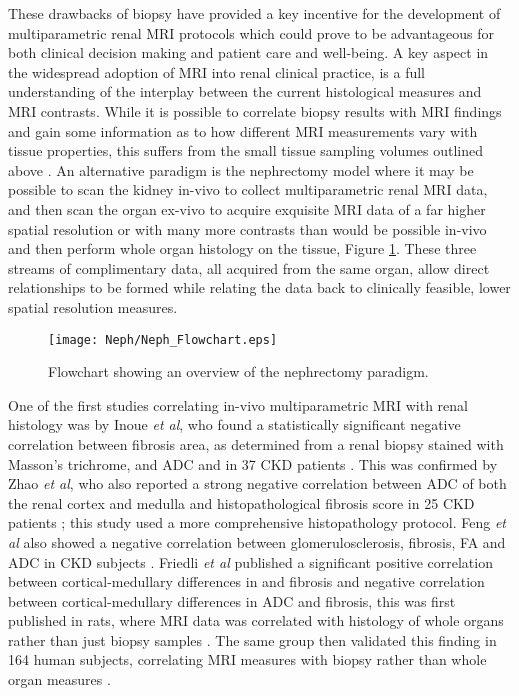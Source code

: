These drawbacks of biopsy have provided a key incentive for the development of multiparametric renal \ac{MRI} protocols which could prove to be advantageous for both clinical decision making and patient care and well-being. A key aspect in the widespread adoption of \ac{MRI} into renal clinical practice, is a full understanding of the interplay between the current histological measures and \ac{MRI} contrasts. While it is possible to correlate biopsy results with \ac{MRI} findings and gain some information as to how different \ac{MRI} measurements vary with tissue properties, this suffers from the small tissue sampling volumes outlined above \cite{leung_could_2017}. An alternative paradigm is the nephrectomy model where it may be possible to scan the kidney in-vivo to collect multiparametric renal \ac{MRI} data, and then scan the organ ex-vivo to acquire exquisite \ac{MRI} data of a far higher spatial resolution or with many more contrasts than would be possible in-vivo and then perform whole organ histology on the tissue, Figure \ref{fig:ex_neph_flowchart}. These three streams of complimentary data, all acquired from the same organ, allow direct relationships to be formed while relating the data back to clinically feasible, lower spatial resolution measures.

\begin{figure}[H]
	\centering
	\texttt{[image: Neph/Neph\_Flowchart.eps]}
	\caption{Flowchart showing an overview of the nephrectomy paradigm.}
	\label{fig:ex_neph_flowchart}	
\end{figure}


One of the first studies correlating in-vivo multiparametric \ac{MRI} with renal histology was by Inoue \textit{et al}, who found a statistically significant negative correlation between fibrosis area, as determined from a renal biopsy stained with Masson's trichrome, and \ac{ADC} and \ttwostar in 37 \ac{CKD} patients \cite{inoue_noninvasive_2011}. This was confirmed by Zhao \textit{et al}, who also reported a strong negative correlation between \ac{ADC} of both the renal cortex and medulla and histopathological fibrosis score in 25 \ac{CKD} patients \cite{zhao_assessment_2014}; this study used a more comprehensive histopathology protocol. Feng \textit{et al} also showed a negative correlation between glomerulosclerosis, fibrosis, \ac{FA} and \ac{ADC} in \ac{CKD} subjects \cite{feng_dti_2015}. Friedli \textit{et al} published a significant positive correlation between cortical-medullary differences in \tone and fibrosis and negative correlation between cortical-medullary differences in  \ac{ADC} and fibrosis, this was first published in rats, where \ac{MRI} data was correlated with histology of whole organs rather than just biopsy samples \cite{friedli_new_2016}. The same group then validated this finding in 164 human subjects, correlating \ac{MRI} measures with biopsy rather than whole organ measures \cite{berchtold_validation_2020}.

